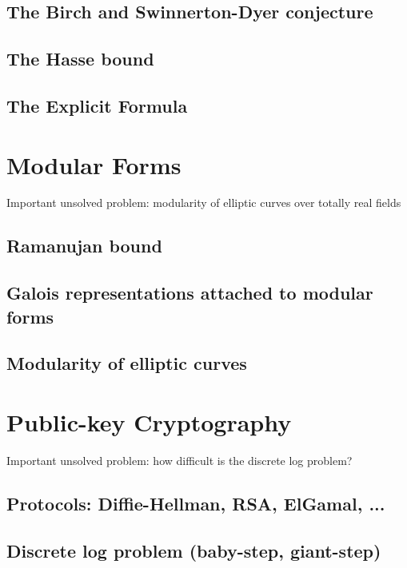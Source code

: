 \documentclass{book}
\begin{document}
\section{The Birch and Swinnerton-Dyer conjecture}
\section{The Hasse bound}
\section{The Explicit Formula}



\chapter{Modular Forms}
Important unsolved problem: modularity of elliptic curves
over totally real fields

\section{Ramanujan bound}
\section{Galois representations attached to modular forms}
\section{Modularity of elliptic curves}




\chapter{Public-key Cryptography}

Important unsolved problem: how difficult is the discrete log problem?

\section{Protocols: Diffie-Hellman, RSA, ElGamal, ...}
\section{Discrete log problem (baby-step, giant-step)}
\end{document}
